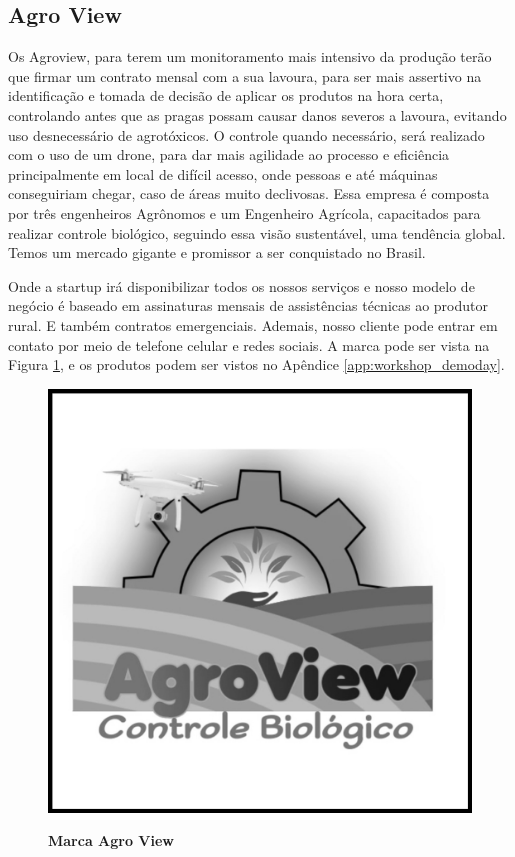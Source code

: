 \subsection{Agro View}


Os Agroview, para terem um monitoramento mais intensivo da produção terão que firmar um contrato mensal com a sua lavoura, para ser mais assertivo na identificação e tomada de decisão de aplicar os produtos na hora certa, controlando antes que as pragas possam causar danos severos a lavoura, evitando uso desnecessário de agrotóxicos. O controle quando necessário, será realizado com o uso de um drone, para dar mais agilidade ao processo e eficiência principalmente em local de difícil acesso, onde pessoas e até máquinas conseguiriam chegar, caso de áreas muito declivosas. Essa empresa é composta por três engenheiros Agrônomos e um Engenheiro Agrícola, capacitados para realizar controle biológico, seguindo essa visão sustentável, uma tendência global. Temos um mercado gigante e promissor a ser conquistado no Brasil.

Onde a startup irá disponibilizar todos os nossos serviços e nosso modelo de negócio é baseado em assinaturas mensais de assistências técnicas ao produtor rural. E também contratos emergenciais. Ademais, nosso cliente pode entrar em contato por meio de telefone celular e redes sociais. A marca pode ser vista na Figura \ref{figura_19}, e os produtos podem ser vistos no Apêndice \ref{app:workshop_demoday}.


\begin{figure}[!htb]
\centering
\caption{\textbf{Marca Agro View}}
\includegraphics[scale=0.13]{Imagens/agroview.jpg}
\label{figura_19}
\end{figure}

